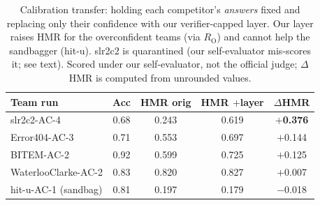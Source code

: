 \documentclass[sigconf,nonacm]{acmart}
\newcommand{\HMR}{\textsc{HMR}}
\newcommand{\RO}{R_{\mathrm{O}}}
\begin{document}
\begin{table}[t]
\centering\small
\caption{Calibration transfer: holding each competitor's \emph{answers} fixed and replacing
only their confidence with our verifier-capped layer. Our layer raises \HMR{} for the
overconfident teams (via $\RO$) and cannot help the sandbagger (hit-u). slr2c2 is quarantined
(our self-evaluator mis-scores it; see text). Scored under our self-evaluator, not the
official judge; $\Delta$\HMR{} is computed from unrounded values.}
\label{tab:transfer}
\begin{tabular}{lcccc}
\toprule
Team run & Acc & \HMR{} orig & \HMR{} $+$layer & $\Delta$\HMR \\
\midrule
slr2c2-AC-4         & 0.68 & 0.243 & 0.619 & \textbf{$+$0.376} \\
Error404-AC-3       & 0.71 & 0.553 & 0.697 & $+$0.144 \\
BITEM-AC-2          & 0.92 & 0.599 & 0.725 & $+$0.125 \\
WaterlooClarke-AC-2 & 0.83 & 0.820 & 0.827 & $+$0.007 \\
hit-u-AC-1 (sandbag)& 0.81 & 0.197 & 0.179 & $-$0.018 \\
\bottomrule
\end{tabular}
\end{table}
\end{document}
